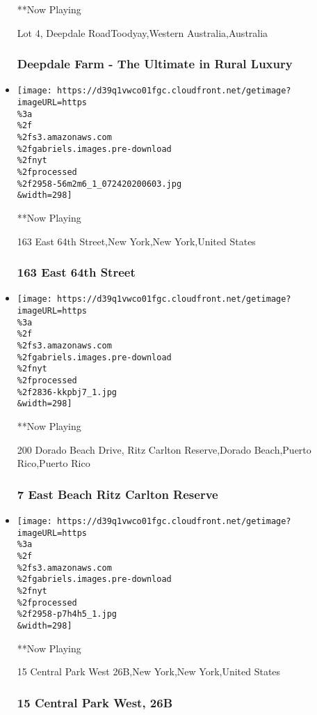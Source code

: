 \begin{itemize}
  **Now Playing

  Lot 4, Deepdale RoadToodyay,Western Australia,Australia

  \hypertarget{deepdale-farm---the-ultimate-in-rural-luxury}{%
  \subsubsection{Deepdale Farm - The Ultimate in Rural
  Luxury}\label{deepdale-farm---the-ultimate-in-rural-luxury}}
\item
  \texttt{[image: https://d39q1vwco01fgc.cloudfront.net/getimage?imageURL=https\\\%3a\\\%2f\\\%2fs3.amazonaws.com\\\%2fgabriels.images.pre-download\\\%2fnyt\\\%2fprocessed\\\%2f2958-56m2m6\_1\_072420200603.jpg\\\&width=298]}

  **Now Playing

  163 East 64th Street,New York,New York,United States

  \hypertarget{163-east-64th-street}{%
  \subsubsection{163 East 64th Street}\label{163-east-64th-street}}
\item
  \texttt{[image: https://d39q1vwco01fgc.cloudfront.net/getimage?imageURL=https\\\%3a\\\%2f\\\%2fs3.amazonaws.com\\\%2fgabriels.images.pre-download\\\%2fnyt\\\%2fprocessed\\\%2f2836-kkpbj7\_1.jpg\\\&width=298]}

  **Now Playing

  200 Dorado Beach Drive, Ritz Carlton Reserve,Dorado Beach,Puerto
  Rico,Puerto Rico

  \hypertarget{7-east-beach-ritz-carlton-reserve}{%
  \subsubsection{7 East Beach Ritz Carlton
  Reserve}\label{7-east-beach-ritz-carlton-reserve}}
\item
  \texttt{[image: https://d39q1vwco01fgc.cloudfront.net/getimage?imageURL=https\\\%3a\\\%2f\\\%2fs3.amazonaws.com\\\%2fgabriels.images.pre-download\\\%2fnyt\\\%2fprocessed\\\%2f2958-p7h4h5\_1.jpg\\\&width=298]}

  **Now Playing

  15 Central Park West 26B,New York,New York,United States

  \hypertarget{15-central-park-west-26b}{%
  \subsubsection{15 Central Park West,
  26B}\label{15-central-park-west-26b}}
\end{itemize}

